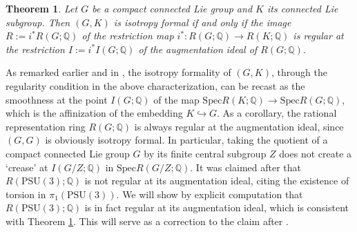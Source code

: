 \documentclass[11pt]{amsart}
\theoremstyle{plain}
\newtheorem{theorem}{Theorem}[section]
\theoremstyle{definition}
\begin{document}
\begin{theorem}\label{rep}
	Let $G$ be a compact connected Lie group and $K$ its connected Lie subgroup. Then $(G, K)$ is isotropy formal if and only if the image $R:=i^*R(G; \mathbb{Q})$ of the restriction map $i^*: R(G;\mathbb{Q})\to R(K;\mathbb{Q})$ is regular at the restriction  $I:=i^*I(G;\mathbb{Q})$ of the augmentation ideal of $R(G;\mathbb{Q})$.
\end{theorem}
As remarked earlier and in \cite[Introduction]{CFok}, the isotropy formality of $(G, K)$, through the regularity condition in the above characterization, can be recast as the smoothness at the point $I(G; \mathbb{Q})$ of the map $\text{Spec}R(K; \mathbb{Q})\to\text{Spec}R(G; \mathbb{Q})$, which is the affinization of the embedding $K\hookrightarrow G$. As a corollary, the rational representation ring $R(G;\mathbb{Q})$ is always regular at the augmentation ideal, since $(G, G)$ is obviously isotropy formal. In particular, taking the quotient of a compact connected Lie group $G$ by its finite central subgroup $Z$ does not create a `crease' at $I(G/Z; \mathbb{Q})$ in $\text{Spec}R(G/Z; \mathbb{Q})$. It was claimed after \cite[Proof of Lemma 4.2]{Ho} that $R(\text{PSU}(3); \mathbb{Q})$ is not regular at its augmentation ideal, citing the existence of torsion in $\pi_1(\text{PSU}(3))$. We will show by explicit computation that $R(\text{PSU}(3); \mathbb{Q})$ is in fact regular at its augmentation ideal, which is consistent with Theorem \ref{rep}. This will serve as a correction to the claim after \cite[Lemma 4.2]{Ho}.

\end{document}

